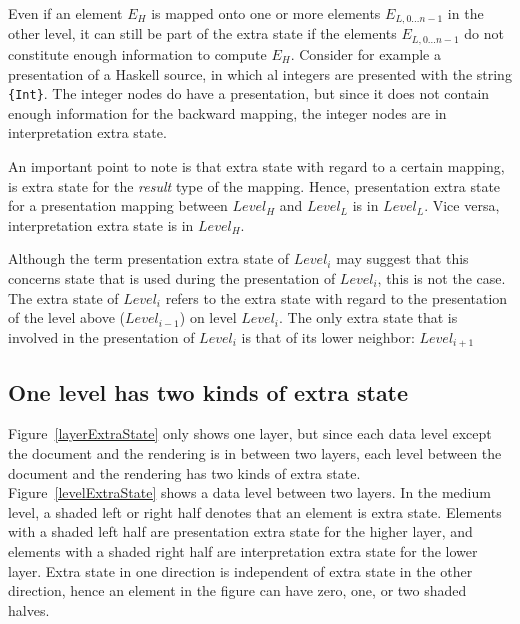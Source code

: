 Even if an element $E_H$ is mapped onto one or more elements $E_{L,0\dots n-1}$  in the other level, it can still be part of the extra state if the elements $E_{L,0\dots n-1}$ do not constitute enough information to compute $E_H$. Consider for example a presentation of a Haskell source, in which al integers are presented with the string \verb|{Int}|. The integer nodes do have a presentation, but since it does not contain enough information for the backward mapping, the integer nodes are in interpretation extra state.  

An important point to note is that extra state with regard to a certain mapping, is extra state for the {\em result} type of the mapping. Hence, presentation extra state for a presentation mapping between $Level_{H}$ and $Level_{L}$ is in $Level_{L}$. Vice versa, interpretation extra state is in $Level_{H}$.

\bc Although the term presentation extra state of $Level_i$ may suggest that this concerns state that is used during the presentation of $Level_i$, this is not the case. The extra state of $Level_i$ refers to the extra state with regard to the presentation of the level above ($Level_{i-1}$) on level $Level_i$. The only extra state that is involved in the presentation of $Level_i$ is that of its lower neighbor: $Level_{i+1}$
\ec


%																
\subsection{One level has two kinds of extra state} \label{sect:oneLevelDoubleES}

Figure~\ref{layerExtraState} only shows one layer, but since each data level except the document and the rendering is in between two layers, each level between the document and the rendering has two kinds of extra state. Figure~\ref{levelExtraState} shows a data level between two layers. In the medium level, a shaded left or right half denotes that an element is extra state. Elements with a shaded left half are presentation extra state for the higher layer, and elements with a shaded right half are interpretation extra state for the lower layer. Extra state in one direction is independent of extra state in the other direction, hence an element in the figure can have zero, one, or two shaded halves.

